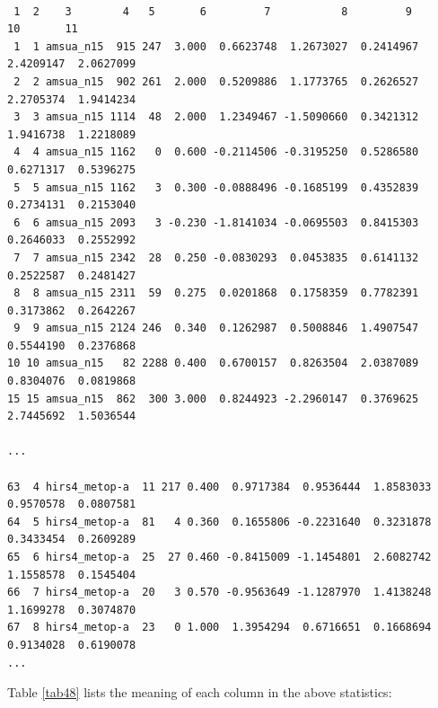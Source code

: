 \begin{itemize}[leftmargin=*]
\begin{scriptsize}
\begin{verbatim}

 1  2    3        4   5       6         7           8         9        10       11
 1  1 amsua_n15  915 247  3.000  0.6623748  1.2673027  0.2414967  2.4209147  2.0627099
 2  2 amsua_n15  902 261  2.000  0.5209886  1.1773765  0.2626527  2.2705374  1.9414234
 3  3 amsua_n15 1114  48  2.000  1.2349467 -1.5090660  0.3421312  1.9416738  1.2218089
 4  4 amsua_n15 1162   0  0.600 -0.2114506 -0.3195250  0.5286580  0.6271317  0.5396275
 5  5 amsua_n15 1162   3  0.300 -0.0888496 -0.1685199  0.4352839  0.2734131  0.2153040
 6  6 amsua_n15 2093   3 -0.230 -1.8141034 -0.0695503  0.8415303  0.2646033  0.2552992
 7  7 amsua_n15 2342  28  0.250 -0.0830293  0.0453835  0.6141132  0.2522587  0.2481427
 8  8 amsua_n15 2311  59  0.275  0.0201868  0.1758359  0.7782391  0.3173862  0.2642267
 9  9 amsua_n15 2124 246  0.340  0.1262987  0.5008846  1.4907547  0.5544190  0.2376868
10 10 amsua_n15   82 2288 0.400  0.6700157  0.8263504  2.0387089  0.8304076  0.0819868
15 15 amsua_n15  862  300 3.000  0.8244923 -2.2960147  0.3769625  2.7445692  1.5036544

...

63  4 hirs4_metop-a  11 217 0.400  0.9717384  0.9536444  1.8583033  0.9570578  0.0807581
64  5 hirs4_metop-a  81   4 0.360  0.1655806 -0.2231640  0.3231878  0.3433454  0.2609289
65  6 hirs4_metop-a  25  27 0.460 -0.8415009 -1.1454801  2.6082742  1.1558578  0.1545404
66  7 hirs4_metop-a  20   3 0.570 -0.9563649 -1.1287970  1.4138248  1.1699278  0.3074870
67  8 hirs4_metop-a  23   0 1.000  1.3954294  0.6716651  0.1668694  0.9134028  0.6190078
...
\end{verbatim}
\end{scriptsize}

Table \ref{tab48} lists the meaning of each column in the above statistics:


\end{itemize}
